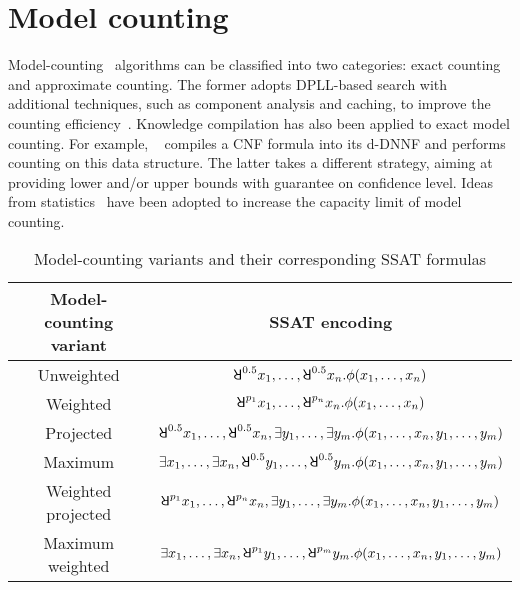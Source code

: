 \section{Model counting}
\label{sect:related-work-model-counting}

Model-counting~\cite{SATHandbook-ModelCounting} algorithms can be classified into two categories:
exact counting and approximate counting.
The former adopts DPLL-based search with additional techniques,
such as component analysis and caching, to improve the counting efficiency~\cite{Sang2004,Sang2005ModelCounting}.
Knowledge compilation has also been applied to exact model counting.
For example, \ctwod~\cite{Darwiche2001,Darwiche2002dDNNF} compiles a CNF formula into its d-DNNF and performs counting on this data structure.
The latter takes a different strategy,
aiming at providing lower and/or upper bounds with guarantee on confidence level.
Ideas from statistics~\cite{Chakraborty2013,Chakraborty2016} have been adopted to increase the capacity limit of model counting.

\begin{table}[t]
    \centering
    \caption{Model-counting variants and their corresponding SSAT formulas}
    \label{tbl:related-work-model-counting}
    \begin{tabular}{c|c}
        Model-counting variant & SSAT encoding                                                                                              \\
        \hline
        Unweighted             & $\random{0.5}x_1,\ldots,\random{0.5}x_n.\pf(x_1,\ldots,x_n)$                                               \\
        Weighted               & $\random{p_1}x_1,\ldots,\random{p_n}x_n.\pf(x_1,\ldots,x_n)$                                               \\
        Projected              & $\random{0.5}x_1,\ldots,\random{0.5}x_n,\exists y_1,\ldots,\exists y_m.\pf(x_1,\ldots,x_n,y_1,\ldots,y_m)$ \\
        Maximum                & $\exists x_1,\ldots,\exists x_n,\random{0.5}y_1,\ldots,\random{0.5}y_m.\pf(x_1,\ldots,x_n,y_1,\ldots,y_m)$ \\
        Weighted projected     & $\random{p_1}x_1,\ldots,\random{p_n}x_n,\exists y_1,\ldots,\exists y_m.\pf(x_1,\ldots,x_n,y_1,\ldots,y_m)$ \\
        Maximum weighted       & $\exists x_1,\ldots,\exists x_n,\random{p_1}y_1,\ldots,\random{p_m}y_m.\pf(x_1,\ldots,x_n,y_1,\ldots,y_m)$ \\
    \end{tabular}
\end{table}

